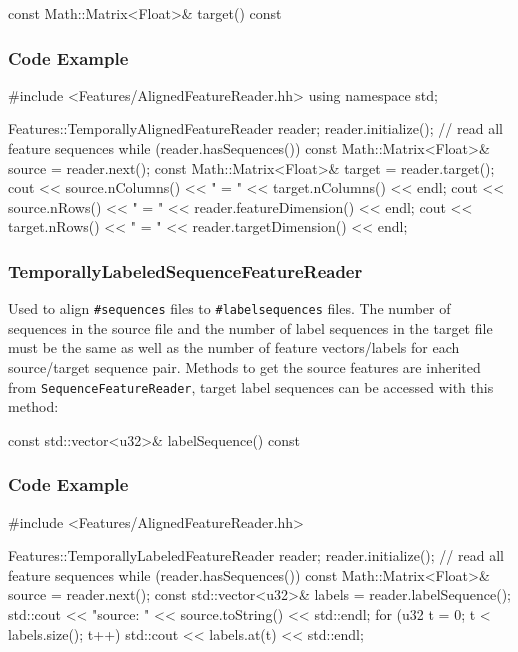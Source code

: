 \begin{fdoc}{const Math::Matrix<Float>\& target() const}
\end{fdoc}

\subsubsection*{Code Example}
\begin{code}
#include <Features/AlignedFeatureReader.hh>
using namespace std;

Features::TemporallyAlignedFeatureReader reader;
reader.initialize();
// read all feature sequences
while (reader.hasSequences()) {
    const Math::Matrix<Float>& source = reader.next();
    const Math::Matrix<Float>& target = reader.target();
    cout << source.nColumns() << " = " << target.nColumns() << endl;
    cout << source.nRows() << " = " << reader.featureDimension() << endl;
    cout << target.nRows() << " = " << reader.targetDimension() << endl;
}
\end{code}


\subsubsection*{TemporallyLabeledSequenceFeatureReader}

Used to align \texttt{\#sequences} files to \texttt{\#labelsequences} files. The number of sequences in the source file and the number of label sequences in the target file must be the same as well as the number of feature vectors/labels for each source/target sequence pair.
Methods to get the source features are inherited from \texttt{SequenceFeatureReader}, target label sequences can be accessed with this method:

\begin{fdoc}{const std::vector<u32>\& labelSequence() const}
\end{fdoc}

\subsubsection*{Code Example}
\begin{code}
#include <Features/AlignedFeatureReader.hh>

Features::TemporallyLabeledFeatureReader reader;
reader.initialize();
// read all feature sequences
while (reader.hasSequences()) {
    const Math::Matrix<Float>& source = reader.next();
    const std::vector<u32>& labels = reader.labelSequence();
    std::cout << "source: " << source.toString() << std::endl;
    for (u32 t = 0; t < labels.size(); t++)
        std::cout << labels.at(t) << std::endl;
}
\end{code}


